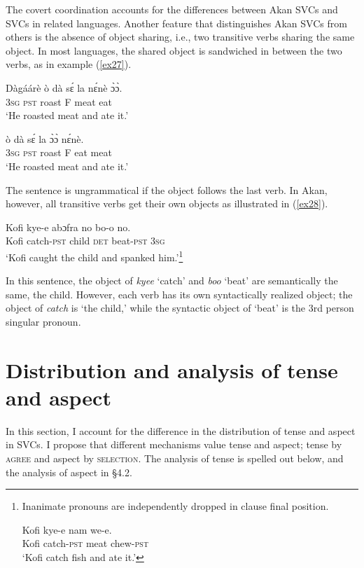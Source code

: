 \documentclass[output=paper,colorlinks,citecolor=brown]{langscibook}
\begin{document}
The covert coordination accounts for the differences between Akan SVCs and SVCs in related languages. Another feature that distinguishes Akan SVCs from others is the absence of object sharing, i.e., two transitive verbs sharing the same object. In most languages, the shared object is sandwiched in between the two verbs, as in example (\ref{ex27}). 

\ea D\`ag\'a\'ar\`e \citep{HiraiwaBodomo2008} \label{ex27}
\ea  \gll \`o d\`a s\'{ɛ} la n\'{ɛ}n\`e \`{ɔ}\`{ɔ}.\\
	3\textsc{sg} \textsc{pst} roast F meat eat\\
\glt`He roasted meat and ate it.'
    
\ex 
\gll * \`o d\`a s\'{ɛ} la  \`{ɔ}\`{ɔ} n\'{ɛ}n\`e.\\
	{} 3\textsc{sg} \textsc{pst} roast F eat meat\\
\glt`He roasted meat and ate it.'

\z 
\z 
The sentence is ungrammatical if the object follows the last verb. In Akan, however, all transitive verbs get their own objects as illustrated in  (\ref{ex28}).

\ea \label{ex28}  \gll  Kofi kye-e abɔfra no bo-o no.\\
	Kofi catch-\textsc{pst} child \textsc{det} beat-\textsc{pst} 3\textsc{sg}\\
\glt`Kofi caught the child and spanked him.'\footnote{Inanimate pronouns are independently dropped in clause final position.

\ea \gll  Kofi kye-e nam we-e.\\
	Kofi catch-\textsc{pst} meat chew-\textsc{pst}\\
\glt`Kofi catch fish and ate it.'
\z }

\z In this sentence, the object of \emph{kyee} `catch' and \emph{boo} `beat' are semantically the same, the child. However, each verb has its own syntactically realized object; the object of \emph{catch} is `the child,' while the syntactic object of `beat' is the 3rd person singular pronoun. 

 
\section{Distribution and analysis of tense and aspect} 
In this section, I account for the difference in the distribution of tense and aspect in SVCs. I propose that different mechanisms value tense and aspect;   tense by \textsc{agree}  and aspect by \textsc{selection}. The analysis of tense is spelled out below, and the analysis of aspect in \S4.2. 
\end{document}

